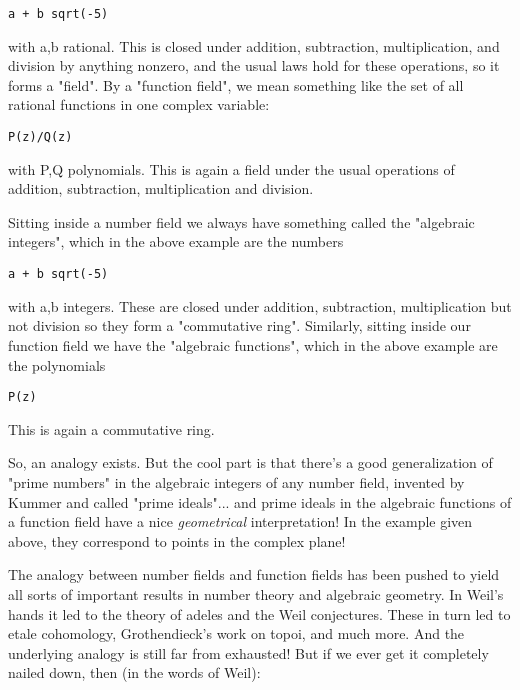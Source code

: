 \begin{verbatim}
a + b sqrt(-5)
\end{verbatim}
    
with a,b rational.  This is closed under addition, subtraction,
multiplication, and division by anything nonzero, and the usual
laws hold for these operations, so it forms a "field".  By a
"function field", we mean something like the set of all rational
functions in one complex variable:

\begin{verbatim}
P(z)/Q(z)                    
\end{verbatim}
    
with P,Q polynomials.  This is again a field under the usual
operations of addition, subtraction, multiplication and division.

Sitting inside a number field we always have something called the 
"algebraic integers", which in the above example are the numbers

\begin{verbatim}
a + b sqrt(-5)
\end{verbatim}
    
with a,b integers.  These are closed under addition, subtraction,
multiplication but not division so they form a "commutative ring".
Similarly, sitting inside our function field we have the "algebraic 
functions", which in the above example are the polynomials

\begin{verbatim}
P(z)
\end{verbatim}
    
This is again a commutative ring.  

So, an analogy exists.  But the cool part is that there's a 
good generalization of "prime numbers" in the algebraic integers
of any number field, invented by Kummer and called "prime ideals"... 
and prime ideals in the algebraic functions of a function field 
have a nice \emph{geometrical} interpretation!  In the example given
above, they correspond to points in the complex plane!

The analogy between number fields and function fields has been 
pushed to yield all sorts of important results in number theory 
and algebraic geometry.  In Weil's hands it led to the theory of 
adeles and the Weil conjectures.  These in turn led to etale 
cohomology, Grothendieck's work on topoi, and much more.  And 
the underlying analogy is still far from exhausted!  But if we 
ever get it completely nailed down, then (in the words of Weil):

